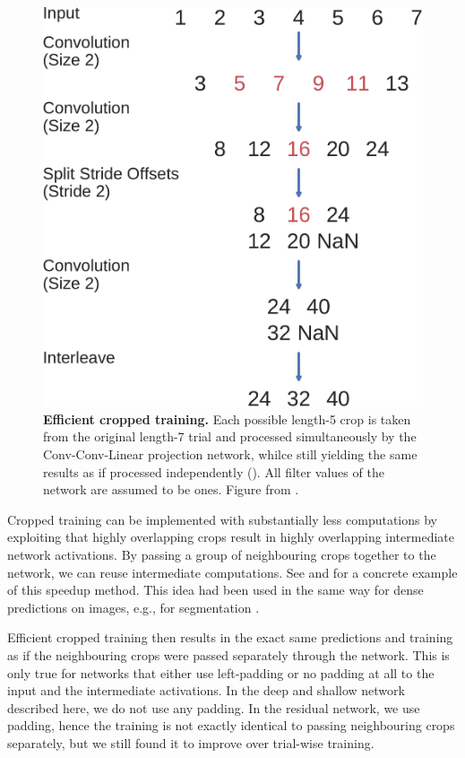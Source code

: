 \begin{figure}[ht]
    \myfloatalign
    \includegraphics[width=0.5\linewidth]{images/Multiple_Prediction_Matplotlib_Graphics.ipynb.3.png}
    \caption[Efficient cropped training]{
    \textbf{Efficient cropped training.} Each possible length-5 crop is
    taken from the original length-7 trial and processed simultaneously by
    the Conv-Conv-Linear projection network, whilce still yielding the same
    results as if processed independently
    (). All filter
    values of the network are assumed to be ones. Figure from
    \cite{schirrmeisterdeephbm2017}.
}
\label{cropped-efficient-computation-figure}
\end{figure}


    Cropped training can be implemented with substantially less computations
by exploiting that highly overlapping crops result in highly overlapping
intermediate network activations. By passing a group of neighbouring
crops together to the network, we can reuse intermediate computations.
See  and
 for a concrete
example of this speedup method. This idea had been used in the same way
for dense predictions on images, e.g., for segmentation
\citep{giusti_fast_2013,nasse_face_2009,sermanet_overfeat:_2013,shelhamer_fully_2016}.

    Efficient cropped training then results in the exact same predictions
and training as if the neighbouring crops were passed separately through
the network. This is only true for networks that either use left-padding
or no padding at all to the input and the intermediate activations. In
the deep and shallow network described here, we do not use any padding.
In the residual network, we use padding, hence the training is not
exactly identical to passing neighbouring crops separately, but we still
found it to improve over trial-wise training.

